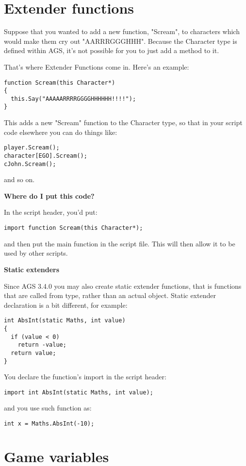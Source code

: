 \section{Extender functions}\label{ExtenderFunctions}%

Suppose that you wanted to add a new function, "Scream", to characters which would make
them cry out "AARRRGGGHHH". Because the Character type is defined within AGS, it's not
possible for you to just add a method to it.

That's where Extender Functions come in. Here's an example:
\begin{verbatim}
function Scream(this Character*)
{
  this.Say("AAAAARRRRGGGGHHHHHH!!!!");
}
\end{verbatim}
This adds a new "Scream" function to the Character type, so that in your script code
elsewhere you can do things like:
\begin{verbatim}
player.Scream();
character[EGO].Scream();
cJohn.Scream();
\end{verbatim}
and so on.

\bf{Where do I put this code?}

In the script header, you'd put:

\verb$import function Scream(this Character*);$

and then put the main function in the script file. This will then allow it to be used
by other scripts.

\bf{Static extenders}

Since AGS 3.4.0 you may also create static extender functions, that is functions that
are called from type, rather than an actual object. Static extender declaration is a bit
different, for example:
\begin{verbatim}
int AbsInt(static Maths, int value)
{
  if (value < 0)
    return -value;
  return value;
}
\end{verbatim}

You declare the function's import in the script header:

\verb$import int AbsInt(static Maths, int value);$

and you use such function as:
\begin{verbatim}
int x = Maths.AbsInt(-10);
\end{verbatim}


\section{Game variables}\label{Gamevariables}%

